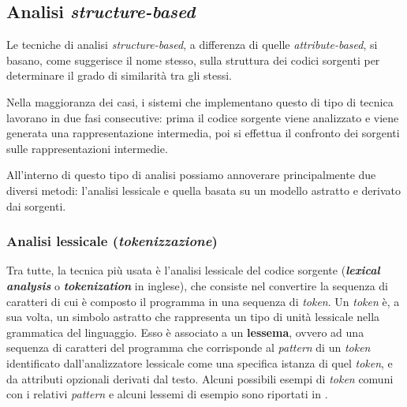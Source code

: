 \subsection{Analisi \textit{structure-based}}
Le tecniche di analisi \textit{structure-based}, a differenza di quelle \textit{attribute-based}, si basano, come suggerisce il nome stesso, sulla struttura dei codici sorgenti per determinare il grado di similarità tra gli stessi.

Nella maggioranza dei casi, i sistemi che implementano questo di tipo di tecnica lavorano in due fasi consecutive: prima il codice sorgente viene analizzato e viene generata una rappresentazione intermedia, poi si effettua il confronto dei sorgenti sulle rappresentazioni intermedie.

All'interno di questo tipo di analisi possiamo annoverare principalmente due diversi metodi: l'analisi lessicale e quella basata su un modello astratto e derivato dai sorgenti.

\subsubsection{Analisi lessicale (\textit{tokenizzazione})}
\label{01-tokenization}

Tra tutte, la tecnica più usata è l'analisi lessicale del codice sorgente (\textbf{\textit{lexical analysis}} o \textbf{\textit{tokenization}} in inglese), che consiste nel convertire la sequenza di caratteri di cui è composto il programma in una sequenza di \textit{token}.
%
Un \textit{token} è, a sua volta, un simbolo astratto che rappresenta un tipo di unità lessicale nella grammatica del linguaggio. 
%
Esso è associato a un \textbf{lessema}, ovvero ad una sequenza di caratteri del programma che corrisponde al \textit{pattern} di un \textit{token} identificato dall'analizzatore lessicale come una specifica istanza di quel \textit{token}, e da attributi opzionali derivati dal testo.
%
Alcuni possibili esempi di \textit{token} comuni con i relativi \textit{pattern} e alcuni lessemi di esempio sono riportati in .


